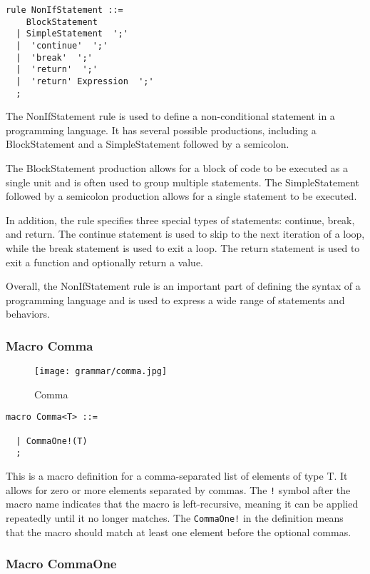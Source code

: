 \begin{lstlisting}
rule NonIfStatement ::=
    BlockStatement 
  | SimpleStatement  ';' 
  |  'continue'  ';' 
  |  'break'  ';' 
  |  'return'  ';' 
  |  'return' Expression  ';' 
  ;
\end{lstlisting}

The NonIfStatement rule is used to define a non-conditional statement in a programming language. It has several possible productions, including a BlockStatement and a SimpleStatement followed by a semicolon.

The BlockStatement production allows for a block of code to be executed as a single unit and is often used to group multiple statements. The SimpleStatement followed by a semicolon production allows for a single statement to be executed.

In addition, the rule specifies three special types of statements: continue, break, and return. The continue statement is used to skip to the next iteration of a loop, while the break statement is used to exit a loop. The return statement is used to exit a function and optionally return a value.

Overall, the NonIfStatement rule is an important part of defining the syntax of a programming language and is used to express a wide range of statements and behaviors.

\subsubsection*{Macro Comma}

\begin{figure}
  \centering
  \texttt{[image: grammar/comma.jpg]}
  \caption{Comma}
  \end{figure}

\begin{lstlisting}
macro Comma<T> ::=
    
  | CommaOne!(T) 
  ;
\end{lstlisting}

This is a macro definition for a comma-separated list of elements of type T. It allows for zero or more elements separated by commas. The \verb|!| symbol after the macro name indicates that the macro is left-recursive, meaning it can be applied repeatedly until it no longer matches. The \verb|CommaOne!| in the definition means that the macro should match at least one element before the optional commas.

\subsubsection*{Macro CommaOne}

